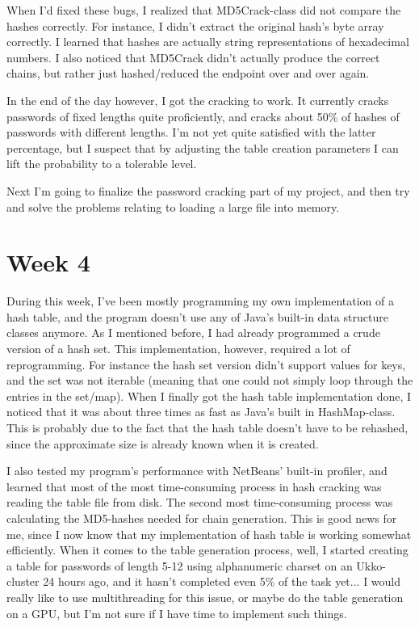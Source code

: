 \documentclass[a4paper, 11pt, finnish]{article}
\begin{document}
When I'd fixed these bugs, I realized that MD5Crack-class did not compare the hashes correctly. For instance, I didn't extract the original hash's byte array correctly. I learned that hashes are actually string representations of hexadecimal numbers. I also noticed that MD5Crack didn't actually produce the correct chains, but rather just hashed/reduced the endpoint over and over again.

In the end of the day however, I got the cracking to work. It currently cracks passwords of fixed lengths quite proficiently, and cracks about 50\% of hashes of passwords with different lengths. I'm not yet quite satisfied with the latter percentage, but I suspect that by adjusting the table creation parameters I can lift the probability to a tolerable level.

Next I'm going to finalize the password cracking part of my project, and then try and solve the problems relating to loading a large file into memory.

\section*{Week 4}
During this week, I've been mostly programming my own implementation of a hash table, and the program doesn't use any of Java's built-in data structure classes anymore. As I mentioned before, I had already programmed a crude version of a hash set. This implementation, however, required a lot of reprogramming. For instance the hash set version didn't support values for keys, and the set was not iterable (meaning that one could not simply loop through the entries in the set/map). When I finally got the hash table implementation done, I noticed that it was about three times as fast as Java's built in HashMap-class. This is probably due to the fact that the hash table doesn't have to be rehashed, since the approximate size is already known when it is created.

I also tested my program's performance with NetBeans' built-in profiler, and learned that most of the most time-consuming process in hash cracking was reading the table file from disk. The second most time-consuming process was calculating the MD5-hashes needed for chain generation. This is good news for me, since I now know that my implementation of hash table is working somewhat efficiently. When it comes to the table generation process, well, I started creating a table for passwords of length 5-12 using alphanumeric charset on an Ukko-cluster 24 hours ago, and it hasn't completed even 5\% of the task yet... I would really like to use multithreading for this issue, or maybe do the table generation on a GPU, but I'm not sure if I have time to implement such things.
\end{document}
